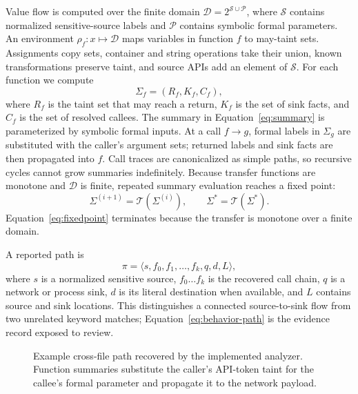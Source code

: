 Value flow is computed over the finite domain
$\mathcal{D}=2^{\mathcal{S}\cup\mathcal{P}}$, where $\mathcal{S}$ contains
normalized sensitive-source labels and $\mathcal{P}$ contains symbolic formal
parameters. An environment $\rho_f:x\mapsto\mathcal{D}$ maps variables in
function $f$ to may-taint sets. Assignments copy sets, container and string
operations take their union, known transformations preserve taint, and source
APIs add an element of $\mathcal{S}$. For each function we compute
\begin{equation}
\Sigma_f=(R_f,K_f,C_f),
\label{eq:summary}
\end{equation}
where $R_f$ is the taint set that may reach a return, $K_f$ is the set of sink
facts, and $C_f$ is the set of resolved callees. The summary in
Equation~\ref{eq:summary} is parameterized by symbolic formal inputs. At a call
$f\rightarrow g$,
formal labels in $\Sigma_g$ are substituted with the caller's argument sets;
returned labels and sink facts are then propagated into $f$. Call traces are
canonicalized as simple paths, so recursive cycles cannot grow summaries
indefinitely. Because transfer functions are monotone and $\mathcal{D}$ is
finite, repeated summary evaluation reaches a fixed point:
\begin{equation}
\Sigma^{(i+1)}=\mathcal{T}(\Sigma^{(i)}),\qquad
\Sigma^{*}=\mathcal{T}(\Sigma^{*}).
\label{eq:fixedpoint}
\end{equation}
Equation~\ref{eq:fixedpoint} terminates because the transfer is monotone over a
finite domain.

A reported path is
\begin{equation}
\pi=\langle s,f_0,f_1,\ldots,f_k,q,d,L\rangle,
\label{eq:behavior-path}
\end{equation}
where $s$ is a normalized sensitive source, $f_0\ldots f_k$ is the recovered
call chain, $q$ is a network or process sink, $d$ is its literal destination
when available, and $L$ contains source and sink locations. This distinguishes
a connected source-to-sink flow from two unrelated keyword matches;
Equation~\ref{eq:behavior-path} is the evidence record exposed to review.

\begin{figure}[!t]
  \centering
  \resizebox{0.98\columnwidth}{!}{}
  \caption{Example cross-file path recovered by the implemented analyzer.
  Function summaries substitute the caller's API-token taint for the callee's
  formal parameter and propagate it to the network payload.}
  \label{fig:behavior-graph}
\end{figure}

